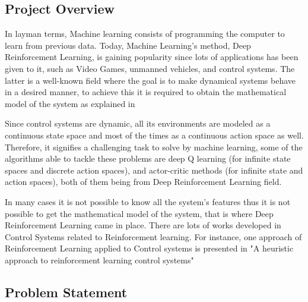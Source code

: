 \subsection{Project Overview}

In layman terms, Machine learning consists of programming the computer to learn from previous data. Today, Machine Learning's method, Deep Reinforcement Learning, is gaining popularity since lots of applications has been given to it, such as Video Games, unmanned vehicles, and control systems. The latter is a well-known field where the goal is to make dynamical systems behave in a desired manner, to achieve this it is required to obtain the mathematical model of the system as explained in \cite{Control}

Since control systems are dynamic, all its environments are modeled as a continuous state space and most of the times as a continuous action space as well. Therefore, it signifies a challenging task to solve by machine learning, some of the algorithms able to tackle these problems are deep Q learning (for infinite state spaces and discrete action spaces), and actor-critic methods (for infinite state and action spaces), both of them being from Deep Reinforcement Learning field. 

In many cases it is not possible to know all the system's features thus it is not possible to get the mathematical model of the system, that is where Deep Reinforcement Learning came in place. There are lots of works developed in Control Systems related to Reinforcement learning. For instance, one approach of Reinforcement Learning applied to Control systems is presented in "A heuristic approach to reinforcement learning control systems" \cite{1098193}

\subsection{Problem Statement}

